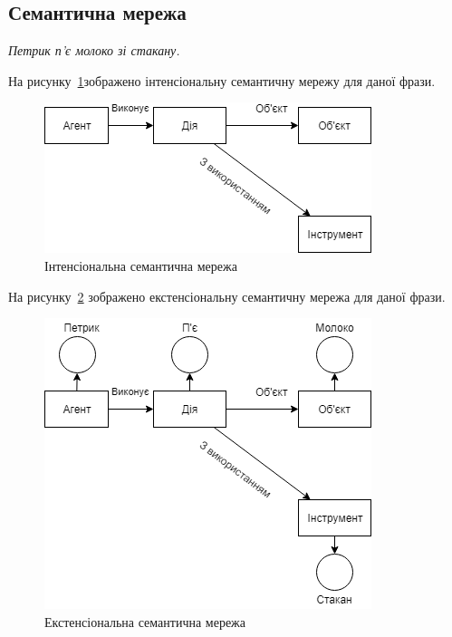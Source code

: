 



\newcommand{\tasknumber}{1} %




\graphicspath{{figures/}}


\Ukrainian


\addtocounter{page}{1}

\subsection{Семантична мережа}
\textit{Петрик п'є молоко зі стакану.}

На рисунку~\ref{fig:semantic_int}зображено  інтенсіональну семантичну мережу для даної фрази.

\begin{figure}[H]
    \centering
        \includegraphics{semantic_int}
    \caption{Інтенсіональна семантична мережа}
    \label{fig:semantic_int}
\end{figure}

На рисунку~\ref{fig:semantic_ext} зображено екстенсіональну семантичну мережа для даної фрази.

\begin{figure}[H]
    \centering
        \includegraphics[width=0.7\linewidth]{semantic_ext}
    \caption{Екстенсіональна семантична мережа}
    \label{fig:semantic_ext}
\end{figure}

